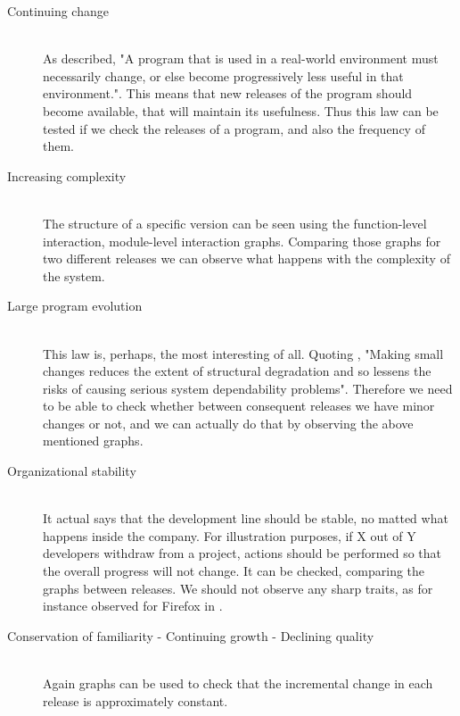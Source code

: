 \begin{description}
	\item[Continuing change] \hfill \\
	As described, "A program that is used in a real-world environment must necessarily change, or else become progressively less useful in that environment.". This means that new releases of the program should become available, that will maintain its usefulness. Thus this law can be tested if we check the releases of a program, and also the frequency of them.
	\item[Increasing complexity] \hfill \\ 
	The structure of a specific version can be seen using the function-level interaction, module-level interaction graphs. Comparing those graphs for two different releases we can observe what happens with the complexity of the system.
	\item[Large program evolution] \hfill \\
	This law is, perhaps, the most interesting of all. Quoting \cite{Lehman}, "Making small changes reduces the extent of structural degradation and so lessens the risks of causing serious system dependability problems". Therefore we need to be able to check whether between consequent releases we have minor changes or not, and we can actually do that by observing the above mentioned graphs.
	\item[Organizational stability] \hfill \\
	It actual says that the development line should be stable, no matted what happens inside the company. For illustration purposes, if X out of Y developers withdraw from a project, actions should be performed so that the overall progress will not change. It can be checked, comparing the graphs between releases. We should not observe any sharp traits, as for instance observed for Firefox in \cite{GraphBased}.
	\item[Conservation of familiarity - Continuing growth - Declining quality] \hfill \\
	Again graphs can be used to  check that the incremental change in each release is approximately constant.
\end{description}




